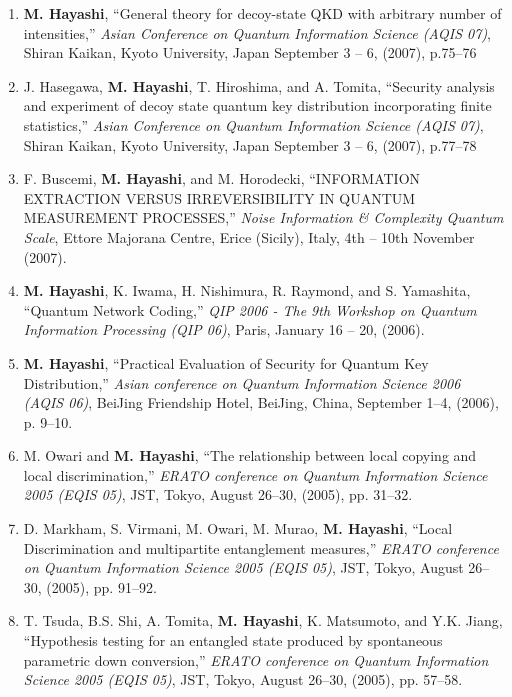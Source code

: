 \documentclass[a4paper,12pt,oneside]{article}
\begin{document}
\begin{enumerate}
\item
\textbf{M. Hayashi}, ``General theory for decoy-state QKD with arbitrary number of intensities,'' 
{\em Asian Conference on Quantum Information Science (AQIS 07)}, 
Shiran Kaikan, Kyoto University, Japan September 3 -- 6, (2007), p.75--76

\item
J. Hasegawa, \textbf{M. Hayashi}, T. Hiroshima, and A. Tomita, 
``Security analysis and experiment of decoy state quantum key distribution incorporating finite statistics,'' 
{\em Asian Conference on Quantum Information Science (AQIS 07)}, 
Shiran Kaikan, Kyoto University, Japan September 3 -- 6, (2007), p.77--78

\item
F. Buscemi, \textbf{M. Hayashi}, and M. Horodecki, ``INFORMATION EXTRACTION VERSUS IRREVERSIBILITY IN QUANTUM MEASUREMENT PROCESSES,'' 
{\em Noise Information \& Complexity \@ Quantum Scale}, 
Ettore Majorana Centre, Erice (Sicily), Italy, 4th -- 10th November (2007). 


\item
\textbf{M. Hayashi}, K. Iwama, H. Nishimura, R. Raymond, and S. Yamashita, ``Quantum Network Coding,'' 
{\em QIP 2006 - The 9th Workshop on Quantum Information Processing (QIP 06)}, 
Paris, January 16 -- 20, (2006).


\item
\textbf{M. Hayashi}, ``Practical Evaluation of Security for Quantum Key Distribution,'' 
{\em Asian conference on Quantum Information Science 2006 (AQIS 06)}, 
BeiJing Friendship Hotel, BeiJing, China, September 1--4, (2006), p. 9--10.


\item
M. Owari and \textbf{M. Hayashi}, ``The relationship between local copying and local discrimination,'' 
{\em ERATO conference on Quantum Information Science 2005 (EQIS 05)}, 
JST, Tokyo, August 26--30, (2005), pp. 31--32.

\item
D. Markham, S. Virmani, M. Owari, M. Murao, \textbf{M. Hayashi}, ``Local Discrimination and multipartite entanglement measures,'' 
{\em ERATO conference on Quantum Information Science 2005 (EQIS 05)}, 
JST, Tokyo, August 26--30, (2005), pp. 91--92.

\item
T. Tsuda, B.S. Shi, A. Tomita, \textbf{M. Hayashi}, K. Matsumoto, and Y.K. Jiang, ``Hypothesis testing for an entangled state produced by spontaneous parametric down conversion,'' 
{\em ERATO conference on Quantum Information Science 2005 (EQIS 05)}, 
JST, Tokyo, August 26--30, (2005), pp. 57--58.



\end{enumerate}
\end{document}
